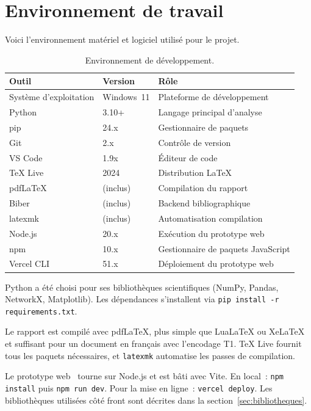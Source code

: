 
\section{Environnement de travail}
\label{sec:environnement}

Voici l'environnement mat\'eriel et logiciel utilis\'e pour le projet.

\begin{table}[H]
\centering
\small
\caption{Environnement de d\'eveloppement.}
\label{tab:environnement}
\begin{tabular}{p{4cm}lp{6cm}}
\toprule
\textbf{Outil} & \textbf{Version} & \textbf{R\^ole} \\
\midrule
Syst\`eme d'exploitation & Windows~11 & Plateforme de d\'eveloppement \\
Python & 3.10+ & Langage principal d'analyse \\
pip & 24.x & Gestionnaire de paquets \\
Git & 2.x & Contr\^ole de version \\
VS Code & 1.9x & \'Editeur de code \\
\TeX{} Live & 2024 & Distribution \LaTeX{} \\
pdf\LaTeX{} & (inclus) & Compilation du rapport \\
Biber & (inclus) & Backend bibliographique \\
latexmk & (inclus) & Automatisation compilation \\
Node.js & 20.x & Ex\'ecution du prototype web \\
npm & 10.x & Gestionnaire de paquets JavaScript \\
Vercel CLI & 51.x & D\'eploiement du prototype web \\
\bottomrule
\end{tabular}
\end{table}

Python a \'et\'e choisi pour ses biblioth\`eques scientifiques (NumPy, Pandas, NetworkX, Matplotlib). Les d\'ependances s'installent via \texttt{pip install -r requirements.txt}.

Le rapport est compil\'e avec pdf\LaTeX{}, plus simple que Lua\LaTeX{} ou Xe\LaTeX{} et suffisant pour un document en fran\c{c}ais avec l'encodage T1. \TeX{} Live fournit tous les paquets n\'ecessaires, et \texttt{latexmk} automatise les passes de compilation.

Le prototype web~\cite{cryptographexplorer_web} tourne sur Node.js et est b\^ati avec Vite. En local~: \texttt{npm install} puis \texttt{npm run dev}. Pour la mise en ligne~: \texttt{vercel deploy}. Les biblioth\`eques utilis\'ees c\^ot\'e front sont d\'ecrites dans la section~\ref{sec:bibliotheques}.
